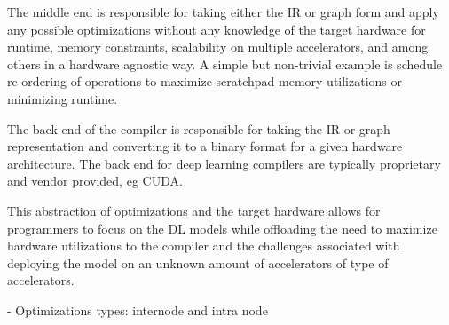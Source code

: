 The middle end is responsible for taking either the IR or graph form and apply
any possible optimizations without any knowledge of the target hardware for
runtime, memory constraints, scalability on multiple accelerators, and among
others in a hardware agnostic way. A simple but non-trivial example is schedule
re-ordering of operations to maximize scratchpad memory utilizations or minimizing
runtime.

The back end of the compiler is responsible for taking the IR or graph
representation and converting it to a binary format for a given hardware
architecture. The back end for deep learning compilers are typically
proprietary and vendor provided, eg CUDA.

This abstraction of optimizations and the target hardware allows for
programmers to focus on the DL models while offloading the need to maximize
hardware utilizations to the compiler and the challenges associated with
deploying the model on an unknown amount of accelerators of type of
accelerators.

- Optimizations types: internode and intra node
